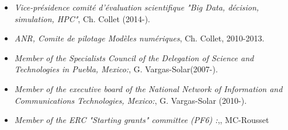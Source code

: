 \begin{itemize}
\setlength{\itemindent}{-0.5cm}
\setlength{\itemsep}{-0.1cm}

\item {\it Vice-pr{\'e}sidence  comit{\'e} d'{\'e}valuation scientifique  "Big Data, d{\'e}cision, simulation, HPC"},   Ch. Collet (2014-).

\item {\it ANR, Comite  de pilotage Mod{\`e}les num{\'e}riques}, Ch. Collet, 2010-2013.

\item {\it Member of the Specialists Council of the Delegation of Science and Technologies in Puebla, Mexico:}, G. Vargas-Solar(2007-).

\item {\it Member of the executive board of the National Network of Information and Communications Technologies, Mexico:}, G. Vargas-Solar (2010-).

\item {\it Member of the ERC "Starting grants" committee (PF6) :},, MC-Rousset 








\end{itemize}

